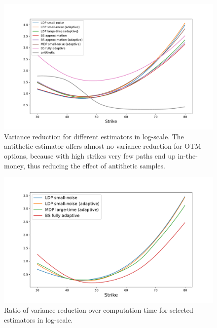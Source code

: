 \begin{figure}[hbt!]
    \centering
    \includegraphics[scale=0.4]{content/reschap3/Figures/HESTON/compare-all-new.pdf}
    \caption{Variance reduction for different estimators in log-scale. 
    The antithetic estimator offers almost no variance reduction for OTM options, because with high strikes very few paths end up in-the-money, thus reducing the effect of antithetic samples.}\label{ref:OverallVarRedu}
\end{figure}

\begin{figure}
    \centering
    \includegraphics[scale=0.4]{content/reschap3/Figures/HESTON/compare-perf-new.pdf}
    \caption{Ratio of variance reduction over computation time for selected estimators in log-scale.}\label{ref:OverallVarComp}
\end{figure}

